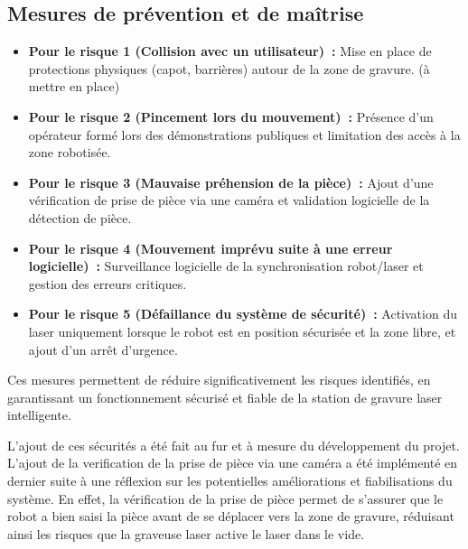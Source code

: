 \subsection{Mesures de prévention et de maîtrise}
\begin{itemize}
    \item \textbf{Pour le risque 1 (Collision avec un utilisateur)~:} Mise en place de protections physiques (capot, barrières) autour de la zone de gravure. (à mettre en place)
    \item \textbf{Pour le risque 2 (Pincement lors du mouvement)~:} Présence d'un opérateur formé lors des démonstrations publiques et limitation des accès à la zone robotisée.
    \item \textbf{Pour le risque 3 (Mauvaise préhension de la pièce)~:} Ajout d'une vérification de prise de pièce via une caméra et validation logicielle de la détection de pièce.
    \item \textbf{Pour le risque 4 (Mouvement imprévu suite à une erreur logicielle)~:} Surveillance logicielle de la synchronisation robot/laser et gestion des erreurs critiques.
    \item \textbf{Pour le risque 5 (Défaillance du système de sécurité)~:} Activation du laser uniquement lorsque le robot est en position sécurisée et la zone libre, et ajout d'un arrêt d'urgence.
\end{itemize}

Ces mesures permettent de réduire significativement les risques identifiés, en garantissant un fonctionnement sécurisé et fiable de la station de gravure laser intelligente.

L'ajout de ces sécurités a été fait au fur et à mesure du développement du projet. L'ajout de la verification de la prise de pièce via une caméra a été implémenté en dernier suite à une réflexion sur les potentielles améliorations et fiabilisations du système. En effet, la vérification de la prise de pièce permet de s'assurer que le robot a bien saisi la pièce avant de se déplacer vers la zone de gravure, réduisant ainsi les risques que la graveuse laser active le laser dans le vide.
